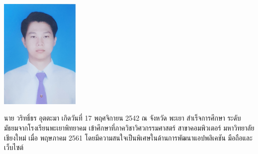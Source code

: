 \documentclass[final]{cpecmu}
\author{นายวริทธิ์ธร อุตตะมา}{Waritthon Auttama}{610610612}
\begin{document}


\pagestyle{empty}\cleardoublepage
\normalspacing \setcounter{page}{1}  \pagestyle{cpecmu}





\ifproject

\fi



\ifproject
\appendix


\ifglossary\glossarypage\fi

\ifindex\indexpage\fi

\begin{biosketch}
\begin{center}
  \includegraphics[width=1.5in]{./image/profile.jpg}
\end{center}
\quad \quad นาย วริทธิ์ธร อุตตะมา เกิดวันที่ 17 พฤศจิกายน 2542 ณ จังหวัด พะเยา สำเร็จการศึกษา
ระดับมัธยมจากโรงเรียนพะเยาพิทยาคม เข้าศึกษาที่ภาควิชาวิศวกรรมศาสตร์ สาขาคอมพิวเตอร์
มหาวิทยาลัยเชียงใหม่ เมื่อ พฤษภาคม 2561 โดยมีความสนใจเป็นพิเศษในด้านการพัฒนาแอปพลิเคชัน
มือถือและเว็บไซต์

\end{biosketch}
\fi %
\end{document}
